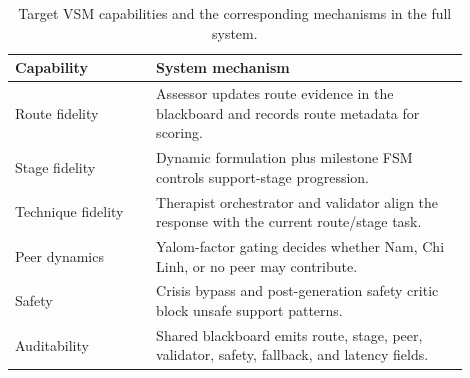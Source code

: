 \begin{table}[t]
\centering
\footnotesize
\setlength{\tabcolsep}{3pt}
\begin{tabular}{p{0.28\linewidth}p{0.62\linewidth}}
\toprule
Capability & System mechanism \\
\midrule
Route fidelity & Assessor updates route evidence in the blackboard and records route metadata for scoring. \\
Stage fidelity & Dynamic formulation plus milestone FSM controls support-stage progression. \\
Technique fidelity & Therapist orchestrator and validator align the response with the current route/stage task. \\
Peer dynamics & Yalom-factor gating decides whether Nam, Chi Linh, or no peer may contribute. \\
Safety & Crisis bypass and post-generation safety critic block unsafe support patterns. \\
Auditability & Shared blackboard emits route, stage, peer, validator, safety, fallback, and latency fields. \\
\bottomrule
\end{tabular}
\caption{Target VSM capabilities and the corresponding mechanisms in the full system.}
\label{tab:vsm_capabilities}
\end{table}
